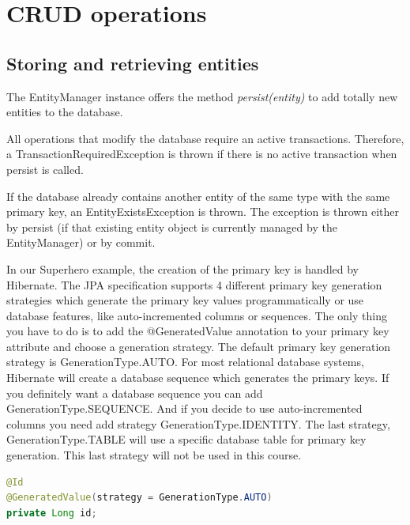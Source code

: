 \section{CRUD operations}

\subsection{Storing and retrieving entities}

The EntityManager instance offers the method \textit{persist(entity)} to add totally new entities to the database.

All operations that modify the database require an active transactions. Therefore, a TransactionRequiredException is thrown if there is no active transaction when persist is called.

If the database already contains another entity of the same type with the same primary key, an EntityExistsException is thrown. The exception is thrown either by persist (if that existing entity object is currently managed by the EntityManager) or by commit.

In our Superhero example, the creation of the primary key is handled by Hibernate.
The JPA specification supports 4 different primary key generation strategies which generate the primary key values programmatically or use database features, like auto-incremented columns or sequences. The only thing you have to do is to add the @GeneratedValue annotation to your primary key attribute and choose a generation strategy. The default primary key generation strategy is GenerationType.AUTO. For most relational database systems, Hibernate will create a database sequence which generates the primary keys.  If you definitely want a database sequence you can add GenerationType.SEQUENCE. And if you decide to use auto-incremented columns you need add strategy GenerationType.IDENTITY. 
The last strategy, GenerationType.TABLE will use a specific database table for primary key generation. This last strategy will not be used in this course.

\begin{lstlisting}[frame=single, language=java]
@Id
@GeneratedValue(strategy = GenerationType.AUTO)
private Long id;
\end{lstlisting}


